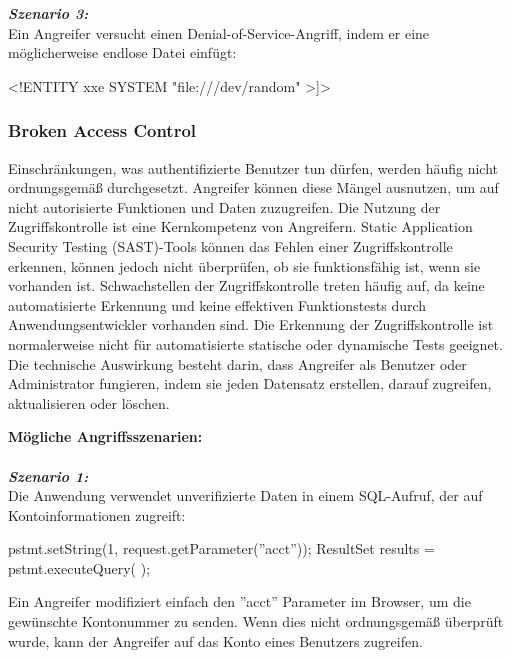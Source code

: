 \textbf{\textit{Szenario 3:}}\\
Ein Angreifer versucht einen Denial-of-Service-Angriff, indem er eine möglicherweise endlose Datei einfügt\cite[10]{owasp17top10}:

\begin{LaTeXCode}[caption={XML-Beispiel 3},captionpos=b, label=LaTeXCode:xxe3][numbers=none]
<!ENTITY xxe SYSTEM "file:///dev/random" >]>
\end{LaTeXCode}

\subsubsection{Broken Access Control}

Einschränkungen, was authentifizierte Benutzer tun dürfen, werden häufig nicht ordnungsgemäß durchgesetzt. Angreifer können diese Mängel ausnutzen, um auf nicht autorisierte Funktionen und Daten zuzugreifen\cite[6]{owasp17top10}. Die Nutzung der Zugriffskontrolle ist eine Kernkompetenz von Angreifern. Static Application Security Testing (SAST)-Tools können das Fehlen einer Zugriffskontrolle erkennen, können jedoch nicht überprüfen, ob sie funktionsfähig ist, wenn sie vorhanden ist. Schwachstellen der Zugriffskontrolle treten häufig auf, da keine automatisierte Erkennung und keine effektiven Funktionstests durch Anwendungsentwickler vorhanden sind. Die Erkennung der Zugriffskontrolle ist normalerweise nicht für automatisierte statische oder dynamische Tests geeignet. Die technische Auswirkung besteht darin, dass Angreifer als Benutzer oder Administrator fungieren, indem sie jeden Datensatz erstellen, darauf zugreifen, aktualisieren oder löschen\cite[11]{owasp17top10}.

\textbf{Mögliche Angriffsszenarien:}\\
\\
\textbf{\textit{Szenario 1:}}\\
Die Anwendung verwendet unverifizierte Daten in einem SQL-Aufruf, der auf Kontoinformationen zugreift\cite[11]{owasp17top10}:

\begin{LaTeXCode}[caption={Broken Access Control - Beispiel 1},captionpos=b, label=LaTeXCode:bac1][numbers=none]
pstmt.setString(1, request.getParameter(''acct''));
ResultSet results = pstmt.executeQuery( );
\end{LaTeXCode}

Ein Angreifer modifiziert einfach den ''acct'' Parameter im Browser, um die gewünschte Kontonummer zu senden. Wenn dies nicht ordnungsgemäß überprüft wurde, kann der Angreifer auf das Konto eines Benutzers zugreifen.\\

